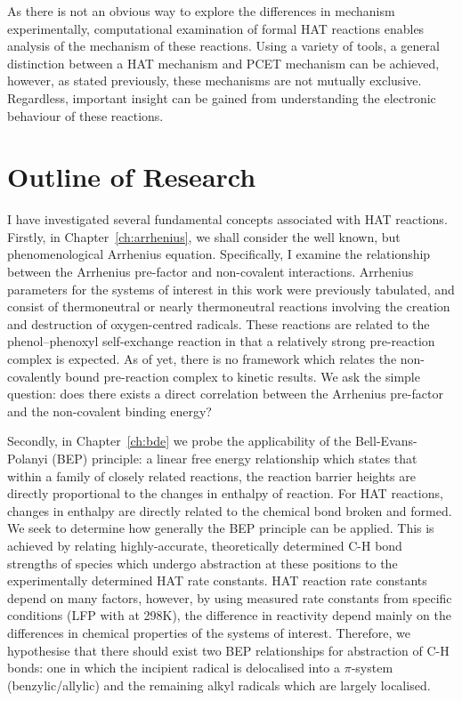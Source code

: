As there is not an obvious way to explore the differences in mechanism experimentally, computational examination of formal HAT reactions enables analysis of the mechanism of these reactions. Using a variety of tools, a general distinction between a HAT mechanism and PCET mechanism can be achieved, however, as stated previously, these mechanisms are not mutually exclusive. Regardless, important insight can be gained from understanding the electronic behaviour of these reactions.

\section{Outline of Research}

I have investigated several fundamental concepts associated with HAT reactions. Firstly, in Chapter~\ref{ch:arrhenius}, we shall consider the well known, but phenomenological Arrhenius equation. Specifically, I examine the relationship between the Arrhenius pre-factor and non-covalent interactions. Arrhenius parameters for the systems of interest in this work were previously tabulated,\cite{DiLabio2005} and consist of thermoneutral or nearly thermoneutral reactions involving the creation and destruction of oxygen-centred radicals. These reactions are related to the phenol--phenoxyl self-exchange reaction in that a relatively strong pre-reaction complex is expected. As of yet, there is no framework which relates the non-covalently bound pre-reaction complex to kinetic results. We ask the simple question: does there exists a direct correlation between the Arrhenius pre-factor and the non-covalent binding energy?

Secondly, in Chapter~\ref{ch:bde} we probe the applicability of the Bell-Evans-Polanyi (BEP) principle: a linear free energy relationship which states that within a family of closely related reactions, the reaction barrier heights are directly proportional to the changes in enthalpy of reaction. For HAT reactions, changes in enthalpy are directly related to the chemical bond broken and formed. We seek to determine how generally the BEP principle can be applied. This is achieved by relating highly-accurate, theoretically determined C-H bond strengths of species which undergo abstraction at these positions to the experimentally determined HAT rate constants. HAT reaction rate constants depend on many factors, however, by using measured rate constants from specific conditions (LFP with \cumo at 298K), the difference in reactivity depend mainly on the differences in chemical properties of the systems of interest. Therefore, we hypothesise that there should exist two BEP relationships for abstraction of C-H bonds: one in which the incipient radical is delocalised into a $\pi$-system (benzylic/allylic) and the remaining alkyl radicals which are largely localised.

